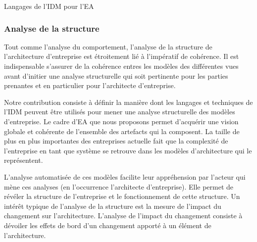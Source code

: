 {\begin{table}[!ht]
    \begin{center}
        
    \end{center}
    \caption{Langages de l'IDM pour l'EA}
    \label{fig:IDM_EA}
\end{table}

\subsubsection{Analyse de la structure}
Tout comme l'analyse du comportement, l'analyse de la structure de 
l'architecture d'entreprise est étroitement lié à l'impératif de cohérence.  Il 
est indispensable s'assurer de la cohérence entres les modèles des différentes 
vues avant d'initier une analyse structurelle qui soit pertinente pour les 
parties prenantes et en particulier pour l'architecte d'entreprise. 

Notre contribution consiste à définir la manière dont les langages et techniques 
de l'IDM peuvent être utilisés pour mener une analyse structurelle des modèles 
d'entreprise. Le cadre d'EA que nous proposons permet d'acquérir une vision 
globale et cohérente de l'ensemble des artefacts qui la composent. La taille de 
plus en plus importantes des entreprises actuelle fait que la complexité de 
l'entreprise en tant que système se retrouve dans les modèles d'architecture qui 
le représentent.

L'analyse automatisée de ces modèles facilite leur appréhension par l'acteur qui 
mène ces analyses (en l'occurrence l'architecte d'entreprise). Elle permet de 
révéler la structure de l'entreprise et le fonctionnement de cette structure. Un 
intérêt  typique de l'analyse de la structure est la mesure de l'impact du 
changement \cite{de2005change} sur l'architecture. L'analyse de l'impact du 
changement consiste à dévoiler les effets de bord d'un changement apporté à un 
élément de l'architecture.  

}
